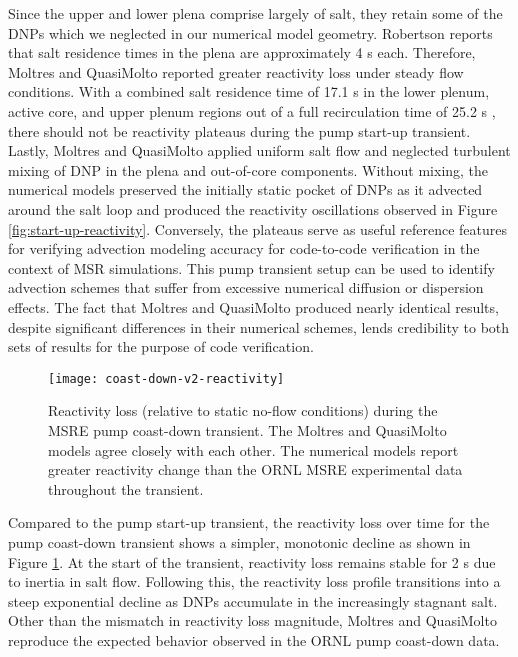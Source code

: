 Since the upper and lower plena comprise largely of salt, they retain some of the \glspl{DNP} which
we neglected in our numerical model geometry. Robertson \cite{robertson_msre_1965} reports that
salt residence times in the plena are approximately 4 s each. Therefore, Moltres and QuasiMolto
reported greater reactivity loss under steady flow conditions. With a combined salt residence time
of 17.1 s in the lower plenum, active core, and upper
plenum regions out of a full recirculation time of 25.2 s \cite{robertson_msre_1965}, there should
not be reactivity plateaus during the pump start-up transient. Lastly, Moltres and QuasiMolto
applied uniform salt flow and neglected turbulent mixing of \gls{DNP} in the plena and out-of-core
components. Without mixing, the numerical models preserved the initially static pocket of
\glspl{DNP} as it advected around the salt loop and produced the reactivity oscillations observed
in Figure \ref{fig:start-up-reactivity}. Conversely, the plateaus serve as
useful reference features for verifying advection modeling accuracy for code-to-code verification
in the context of \gls{MSR} simulations. This pump transient setup can be used to identify
advection schemes that suffer from excessive numerical diffusion or dispersion effects. The fact
that Moltres and QuasiMolto produced nearly identical results, despite significant differences in
their numerical schemes, lends credibility to both sets of results for the purpose of code
verification.

\begin{figure}[b]
  \centering
  \texttt{[image: coast-down-v2-reactivity]}
  \caption{Reactivity loss (relative to static no-flow conditions) during the \gls{MSRE} pump
  coast-down transient. The Moltres and QuasiMolto models agree closely with each other. The
  numerical models report greater reactivity change than the \gls{ORNL} \gls{MSRE} experimental
  data throughout the transient.}
  \label{fig:coast-down-reactivity}
\end{figure}

Compared to the pump start-up transient, the reactivity loss over time for the pump coast-down
transient shows a simpler, monotonic decline as shown in Figure \ref{fig:coast-down-reactivity}.
At the start of the transient, reactivity loss remains stable for 2 s due to inertia in salt flow.
Following this, the reactivity loss profile transitions into a steep exponential decline as
\glspl{DNP} accumulate in the increasingly stagnant salt. Other than the mismatch in reactivity
loss magnitude, Moltres and QuasiMolto reproduce the expected behavior observed in the \gls{ORNL}
pump coast-down data.

